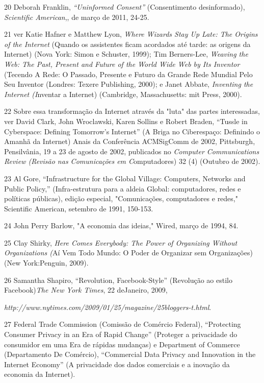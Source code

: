 20 Deborah Franklin, \emph{``Uninformed Consent''} (Consentimento
desinformado), \emph{Scientific American},, de março de 2011, 24-25.

21 ver Katie Hafner e Matthew Lyon, \emph{Where Wizards Stay Up Late:
The Origins of the Internet} (Quando os assistentes ficam acordados até
tarde: as origens da Internet) (Nova York: Simon e Schuster, 1999); Tim
Berners-Lee, \emph{Weaving the Web: The Past, Present and Future of the
World Wide Web by Its Inventor} (Tecendo A Rede: O Passado, Presente e
Futuro da Grande Rede Mundial Pelo Seu Inventor (Londres: Texere
Publishing, 2000); e Janet Abbate, \emph{Inventing the Internet
(I}nventar a Internet) (Cambridge, Massachusetts: mit Press, 2000).

22 Sobre essa transformação da Internet através da "luta" das partes
interessadas, ver David Clark, John Wroclawski, Karen Sollins e Robert
Braden, ``Tussle in Cyberspace: Defining Tomorrow's Internet'' (A Briga
no Ciberespaço: Definindo o Amanhã da Internet) Anais da Conferência
ACMSigComm de 2002, Pittsburgh, Pensilvânia, 19 a 23 de agosto de 2002,
publicados no \emph{Computer Communications Review (Revisão nas
Comunicações em C}omputadores) 32 (4) (Outubro de 2002).

23 Al Gore, ``Infrastructure for the Global Village: Computers, Networks
and Public Policy,'' (Infra-estrutura para a aldeia Global:
computadores, redes e políticas públicas), edição especial,
"Comunicações, computadores e redes," Scientific American, setembro de
1991, 150-153.

24 John Perry Barlow, "A economia das ideias," Wired, março de 1994, 84.

25 Clay Shirky, \emph{Here Comes Everybody: The Power of Organizing
Without Organizations (}Aí Vem Todo Mundo: O Poder de Organizar sem
Organizações) (New York:Penguin, 2009).

26 Samantha Shapiro, ``Revolution, Facebook-Style'' (Revolução ao estilo
Facebook)\emph{The New York Times}, 22 deJaneiro, 2009,

\emph{http://www.nytimes.com/2009/01/25/magazine/25bloggers-t.html}.

27 Federal Trade Commission (Comissão de Comércio Federal), ``Protecting
Consumer Privacy in an Era of Rapid Change'' (Proteger a privacidade do
consumidor em uma Era de rápidas mudanças) e Department of Commerce
(Departamento De Comércio), ``Commercial Data Privacy and Innovation in
the Internet Economy'' (A privacidade dos dados comerciais e a inovação
da economia da Internet).

